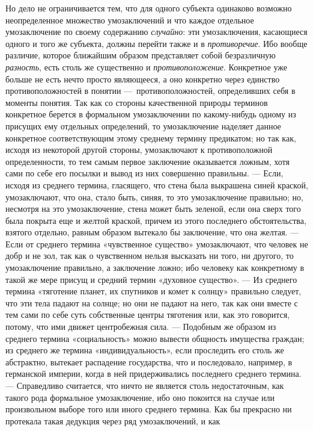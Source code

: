 \documentclass[twoside]{article}
\begin{document}
{{{Но дело не ограничивается тем, что для одного субъекта
одинаково возможно неопределенное множество умозаключений и что каждое
отдельное умозаключение по своему содержанию
{\em случайно}: эти
умозаключения, касающиеся одного и того же субъекта, должны перейти также и
в {\em противоречие}. Ибо
вообще различие, которое ближайшим образом представляет собой безразличную
{\em разность}, есть
столь же существенно и
{\em противоположение}.
Конкретное уже больше не есть нечто просто являющееся, а оно
конкретно через единство противоположностей в понятии
—~противоположностей, определивших себя в моменты понятия.
Так как со стороны качественной природы терминов конкретное берется в
формальном умозаключении по какому-нибудь одному из присущих ему отдельных
определений, то умозаключение наделяет данное конкретное соответствующим
этому среднему термину предикатом; но так как, исходя из некоторой другой
стороны, умозаключают к противоположной определенности, то тем самым первое
заключение оказывается ложным, хотя сами по себе его посылки и вывод из них
совершенно правильны. — Если, исходя из среднего термина,
гласящего, что стена была выкрашена синей краской, умозаключают, что она,
стало быть, синяя, то это умозаключение правильно; но, несмотря на это
умозаключение, стена может быть зеленой, если она сверх того была покрыта
еще и желтой краской, причем из этого последнего обстоятельства, взятого
отдельно, равным образом вытекало бы заключение, что она
желтая. — Если от среднего термина «чувственное существо»
умозаключают, что человек не добр и не зол, так как о чувственном нельзя
высказать ни того, ни другого, то умозаключение правильно, а заключение
ложно; ибо человеку как конкретному в такой же мере присущ и средний термин
«духовное существо». — Из среднего термина «тяготение
планет, их спутников и комет к солнцу» правильно следует, что эти тела
падают на солнце; но они не падают на него, так как они вместе с тем сами
по себе суть собственные центры тяготения или, как это говорится, потому,
что ими движет центробежная сила. — Подобным же образом из
среднего термина «социальность» можно вывести общность имущества граждан;
из среднего же термина «индивидуальность», если проследить его столь же
абстрактно, вытекает распадение государства, что и последовало, например, в
германской империи, когда в ней придерживались последнего среднего
термина. — Справедливо считается, что ничто не является
столь недостаточным, как такого рода формальное умозаключение, ибо оно
покоится на случае или произвольном выборе того или иного среднего термина.
Как бы прекрасно ни протекала такая дедукция через ряд умозаключений, и как
}}}
\end{document}
